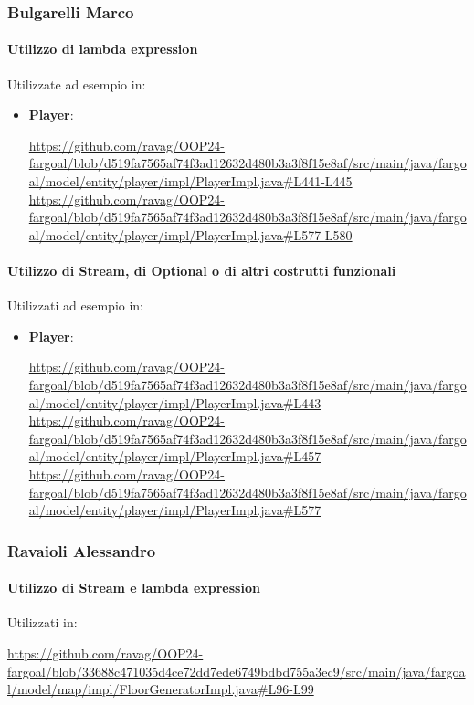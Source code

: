 \documentclass{report}
\begin{document}
\subsubsection{Bulgarelli Marco}

\paragraph{Utilizzo di lambda expression}Utilizzate ad esempio in:
\begin{itemize}
    \item \textbf{Player}: 
        \begin{sloppypar}
        \url{https://github.com/ravag/OOP24-fargoal/blob/d519fa7565af74f3ad12632d480b3a3f8f15e8af/src/main/java/fargoal/model/entity/player/impl/PlayerImpl.java#L441-L445}
        \url{https://github.com/ravag/OOP24-fargoal/blob/d519fa7565af74f3ad12632d480b3a3f8f15e8af/src/main/java/fargoal/model/entity/player/impl/PlayerImpl.java#L577-L580}
        \end{sloppypar}
\end{itemize}

\paragraph{Utilizzo di Stream, di Optional o di altri costrutti funzionali}Utilizzati ad esempio in:
\begin{itemize}
    \item \textbf{Player}:
        \begin{sloppypar}
            \url{https://github.com/ravag/OOP24-fargoal/blob/d519fa7565af74f3ad12632d480b3a3f8f15e8af/src/main/java/fargoal/model/entity/player/impl/PlayerImpl.java#L443}
            \url{https://github.com/ravag/OOP24-fargoal/blob/d519fa7565af74f3ad12632d480b3a3f8f15e8af/src/main/java/fargoal/model/entity/player/impl/PlayerImpl.java#L457}
            \url{https://github.com/ravag/OOP24-fargoal/blob/d519fa7565af74f3ad12632d480b3a3f8f15e8af/src/main/java/fargoal/model/entity/player/impl/PlayerImpl.java#L577}
        \end{sloppypar}
\end{itemize}

\subsubsection{Ravaioli Alessandro}
\paragraph{Utilizzo di Stream e lambda expression}
Utilizzati in: 
\begin{sloppypar}
    \url{https://github.com/ravag/OOP24-fargoal/blob/33688c471035d4ce72dd7ede6749bdbd755a3ec9/src/main/java/fargoal/model/map/impl/FloorGeneratorImpl.java#L96-L99}
\end{sloppypar}
\end{document}
